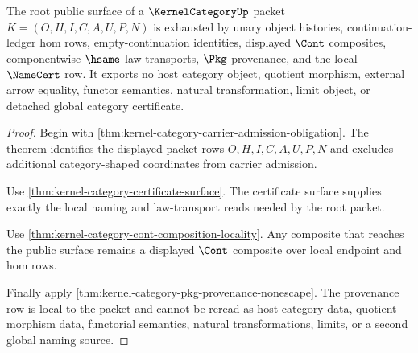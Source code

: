 \begin{theorem}
\label{thm:kernel-category-root-nonescape-surface}
The root public surface of a $\KernelCategoryUp$ packet $K=(O,H,I,C,A,U,P,N)$ is exhausted by unary object histories, continuation-ledger hom rows, empty-continuation identities, displayed $\Cont$ composites, componentwise $\hsame$ law transports, $\Pkg$ provenance, and the local $\NameCert$ row. It exports no host category object, quotient morphism, external arrow equality, functor semantics, natural transformation, limit object, or detached global category certificate.
\end{theorem}
\begin{proof}
Begin with \autoref{thm:kernel-category-carrier-admission-obligation}. The theorem identifies the displayed packet rows $O,H,I,C,A,U,P,N$ and excludes additional category-shaped coordinates from carrier admission.

Use \autoref{thm:kernel-category-certificate-surface}. The certificate surface supplies exactly the local naming and law-transport reads needed by the root packet.

Use \autoref{thm:kernel-category-cont-composition-locality}. Any composite that reaches the public surface remains a displayed $\Cont$ composite over local endpoint and hom rows.

Finally apply \autoref{thm:kernel-category-pkg-provenance-nonescape}. The provenance row is local to the packet and cannot be reread as host category data, quotient morphism data, functorial semantics, natural transformations, limits, or a second global naming source.
\end{proof}

